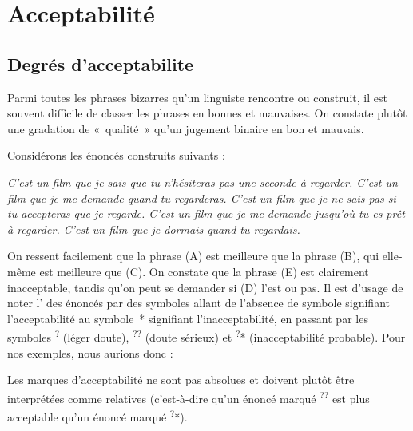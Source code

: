 \section{Acceptabilité}\label{sec:1.1.11}
\subsection{Degrés d'acceptabilite}
Parmi toutes les phrases bizarres qu’un linguiste rencontre ou construit, il est souvent difficile de classer les phrases en bonnes et mauvaises. On constate plutôt une gradation de «~qualité~» qu’un jugement binaire en bon et mauvais.

Considérons les énoncés construits suivants :

\ea
\ea \itshape C’est un film que je sais que tu n’hésiteras pas une seconde à regarder.
\ex \itshape C’est un film que je me demande quand tu regarderas.
\ex \itshape C’est un film que je ne sais pas si tu accepteras que je regarde.
\ex \itshape C’est un film que je me demande jusqu’où tu es prêt à regarder.
\ex \itshape C’est un film que je dormais quand tu regardais.
\z
\z

On ressent facilement que la phrase (A) est meilleure que la phrase (B), qui elle-même est meilleure que (C). On constate que la phrase (E) est clairement inacceptable, tandis qu’on peut se demander si (D) l’est ou pas. Il est d’usage de noter l’ des énoncés par des symboles allant de l’absence de symbole signifiant l’acceptabilité au symbole~* signifiant l’inacceptabilité, en passant par les symboles \textsuperscript{?} (léger doute), \textsuperscript{??} (doute sérieux) et \textsuperscript{?}* (inacceptabilité probable). Pour nos exemples, nous aurions donc :

\ea
{}
\z
\z

Les marques d’acceptabilité ne sont pas absolues et doivent plutôt être interprétées comme relatives (c’est-à-dire qu’un énoncé marqué \textsuperscript{??} est plus acceptable qu’un énoncé marqué \textsuperscript{?}*).


